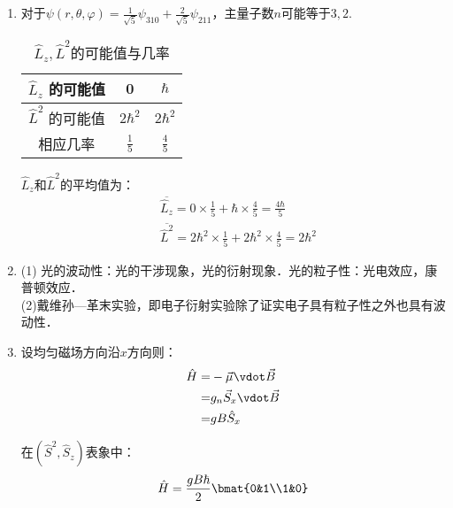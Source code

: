 
\begin{issues}
\issueTODO
\issueDraft
\end{issues}

\subsection{ }
\begin{enumerate}
\item 对于$\psi(r,\theta,\varphi) = \frac{1}{\sqrt{5}}\psi_{310} + \frac{2}{\sqrt{5}}\psi_{211} $，主量子数$n$可能等于$3,2$.\\
\begin{table}[ht]
\centering
\caption{$\hat{L}_{z},\hat{L}^{2}$的可能值与几率}\label{TJU14A_tab1}
\begin{tabular}{|c|c|c|}
\hline
$\hat{L}_z$ 的可能值 & 0 & $\hbar$  \\
\hline
$\hat{L}^2$ 的可能值 & $2\hbar^{2}$ & $2\hbar^{2}$  \\
\hline
相应几率 & $\frac{1}{5}$ & $\frac{4}{5}$  \\
\hline
\end{tabular}
\end{table}
$\hat{L}_{z}$和$\hat{L}^{2}$的平均值为：\\
\begin{align}\label{TJU14A_eq1}
& \overline{\hat{L}_{z}} = 0 \times \frac{1}{5} + \hbar \times \frac{4}{5} = \frac{4\hbar}{5} \\
& \overline{\hat{L}^{2}} = 2\hbar^{2} \times \frac{1}{5} + 2\hbar^{2} \times \frac{4}{5} = 2\hbar^{2}
\end{align}
\item (1) 光的波动性：光的干涉现象，光的衍射现象．光的粒子性：光电效应，康普顿效应．\\
(2)戴维孙—革末实验，即电子衍射实验除了证实电子具有粒子性之外也具有波动性．
\item 设均匀磁场方向沿$x$方向则：
\begin{equation}
\begin{aligned}
\hat{H}=& -\vec{\mu}\vdot \vec{B} \\
=& g_{n}\vec{S}_{x}\vdot \vec{B} \\
=& gB\hat{S}_{x}
\end{aligned}
\end{equation}

在$(\hat{S}^{2},\hat{S}_{z})$表象中：
\begin{equation}
\hat{H}=\frac{gB\hbar}{2}\bmat{0&1\\1&0}
\end{equation}


\end{enumerate}
